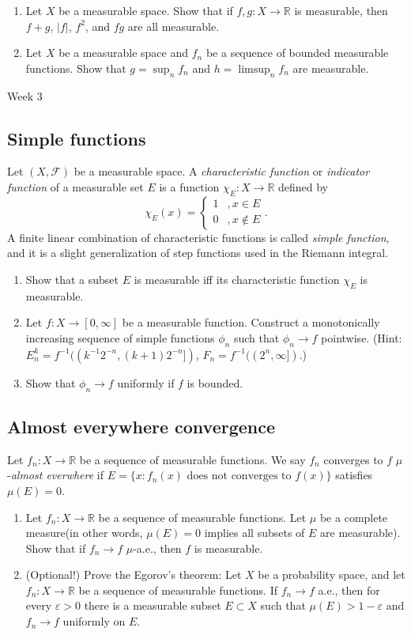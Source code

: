 \documentclass{article}
\def\R{\mathbb{R}}
\def\cF{\mathcal{F}}
\def\e{\varepsilon}
\begin{document}
\begin{enumerate}
\item Let $X$ be a measurable space. Show that if $f,g:X\to\R$ is measurable, then $f+g$, $|f|$, $f^2$, and $fg$ are all measurable.
\item Let $X$ be a measurable space and $f_n$ be a sequence of bounded measurable functions. Show that $g=\sup_nf_n$ and $h=\limsup_nf_n$ are measurable.
\end{enumerate}


\clearpage

Week 3

\subsection*{Simple functions}
Let $(X,\cF)$ be a measurable space.
A \emph{characteristic function} or \emph{indicator function} of a measurable set $E$ is a function $\chi_E:X\to\R$ defined by
\[\chi_E(x)=\begin{cases}1&,x\in E\\0&,x\notin E\end{cases}.\]
A finite linear combination of characteristic functions is called \emph{simple function}, and it is a slight generalization of step functions used in the Riemann integral.

\begin{enumerate}
\item Show that a subset $E$ is measurable iff its characteristic function $\chi_E$ is measurable.
\item Let $f:X\to[0,\infty]$ be a measurable function. Construct a monotonically increasing sequence of simple functions $\phi_n$ such that $\phi_n\to f$ pointwise. (Hint: $E_n^k=f^{-1}((k^{-1}2^{-n},(k+1)2^{-n}])$, $F_n=f^{-1}((2^n,\infty])$.)
\item Show that $\phi_n\to f$ uniformly if $f$ is bounded.
\end{enumerate}

\subsection*{Almost everywhere convergence}
Let $f_n:X\to\R$ be a sequence of measurable functions.
We say $f_n$ converges to $f$ $\mu$-\emph{almost everwhere} if $E=\{x:f_n(x)\text{ does not converges to }f(x)\}$ satisfies $\mu(E)=0$.

\begin{enumerate}
\item Let $f_n:X\to\R$ be a sequence of measurable functions. Let $\mu$ be a complete measure(in other words, $\mu(E)=0$ implies all subsets of $E$ are measurable). Show that if $f_n\to f$ $\mu$-a.e., then $f$ is measurable.
\item (Optional!) Prove the Egorov's theorem: Let $X$ be a probability space, and let $f_n:X\to\R$ be a sequence of measurable functions. If $f_n\to f$ a.e., then for every $\e>0$ there is a measurable subset $E\subset X$ such that $\mu(E)>1-\e$ and $f_n\to f$ uniformly on $E$.
\end{enumerate}
\end{document}
